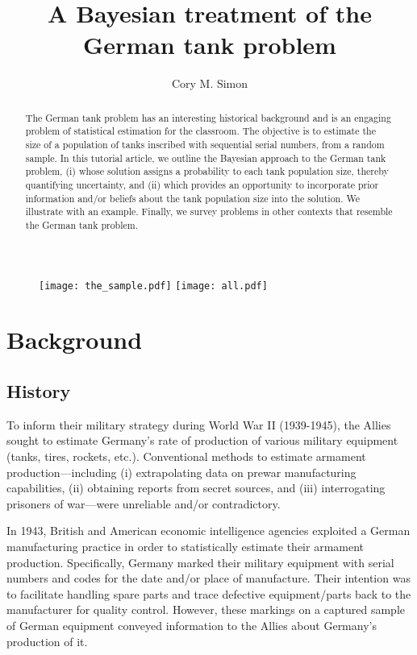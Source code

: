 \documentclass[11pt, oneside]{article}
\title{A Bayesian treatment of the German tank problem}
\author[1]{Cory M. Simon}
\affil[1]{School of Chemical, Biological, and Environmental Engineering. Oregon State University. Corvallis, OR. USA. }
\affil[]{\texttt{cory.simon@oregonstate.edu}}
\begin{document}
\maketitle

\begin{abstract}
	The German tank problem has an interesting historical background and is an engaging problem of statistical estimation for the classroom. The objective is to estimate the size of a population of tanks inscribed with sequential serial numbers, from a random sample. In this tutorial article, we outline the Bayesian approach to the German tank problem, (i) whose solution assigns a probability to each tank population size, thereby quantifying uncertainty, and (ii) which provides an opportunity to incorporate prior information and/or beliefs about the tank population size into the solution. We illustrate with an example. Finally, we survey problems in other contexts that resemble the German tank problem.
\end{abstract}



\begin{figure}[h!]
	\centering
 \texttt{[image: the\_sample.pdf]}
 \texttt{[image: all.pdf]}
\end{figure}

\clearpage

\section{Background}

\subsection{History}
To inform their military strategy during World War II (1939-1945), the Allies sought to estimate Germany's rate of production of various military equipment (tanks, tires, rockets, etc.).
Conventional methods to estimate armament production---including 
(i) extrapolating data on prewar manufacturing capabilities, 
(ii) obtaining reports from secret sources, and 
(iii) interrogating prisoners of war---were unreliable and/or contradictory. 

In 1943, British and American economic intelligence agencies exploited a German manufacturing practice in order to statistically estimate their armament production. 
Specifically, Germany marked their military equipment with serial numbers and codes for the date and/or place of manufacture. Their intention was to facilitate handling spare parts and trace defective equipment/parts back to the manufacturer for quality control.
However, these markings on a captured sample of German equipment conveyed information to the Allies about Germany's production of it.
\end{document}
